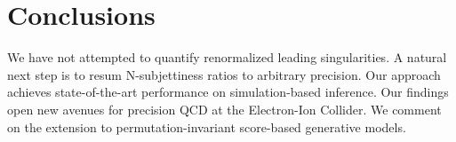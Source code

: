 \section{Conclusions}\label{sec:conclusions}

We have not attempted to quantify renormalized leading singularities. A
natural next step is to resum N-subjettiness ratios to arbitrary
precision. Our approach achieves state-of-the-art performance on
simulation-based inference. Our findings open new avenues for precision
QCD at the Electron-Ion Collider. We comment on the extension to
permutation-invariant score-based generative models.

